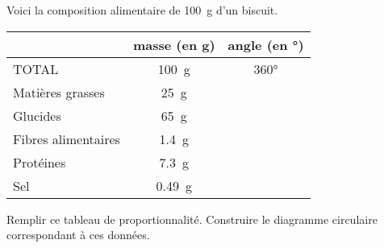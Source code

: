 \documentclass[../Cours.tex]{subfiles}
\begin{document}
\clearpage
\EXERCICES 
\begin{questions}
    \exercice 
    Voici la composition alimentaire de \qty{100}{\gram} d'un biscuit.

    \begin{center}
        \begin{tabularx}{0.6\linewidth}{|l|C|C|}\hline
            & masse (en \unit{\gram}) & angle (en \unit{°}) \\\hline
            TOTAL & \qty{100}{\gram} & \ang{360} \\ \hline \hline 
            Matières grasses & \qty{25}{\gram} & \\\hline
            Glucides & \qty{65}{\gram} & \\\hline
            Fibres alimentaires & \qty{1.4}{\gram} & \\\hline
            Protéines & \qty{7.3}{\gram} & \\\hline
            Sel & \qty{0.49}{\gram} & \\\hline
        \end{tabularx}
    \end{center}

    \question Remplir ce tableau de proportionnalité.
    \question Construire le diagramme circulaire correspondant à ces données.
\end{questions}
\end{document}
